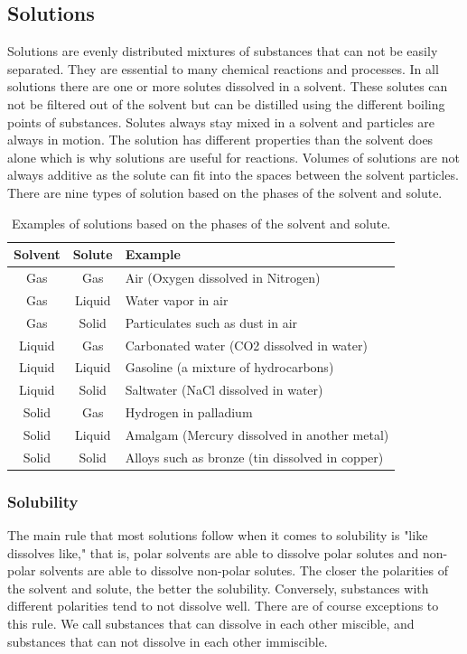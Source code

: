 \subsection{Solutions}
Solutions are evenly distributed mixtures of substances that can not be easily separated. They are essential to many chemical reactions and processes. In all solutions there are one or more solutes dissolved in a solvent. These solutes can not be filtered out of the solvent but can be distilled using the different boiling points of substances. Solutes always stay mixed in a solvent and particles are always in motion. The solution has different properties than the solvent does alone which is why solutions are useful for reactions. Volumes of solutions are not always additive as the solute can fit into the spaces between the solvent particles. There are nine types of solution based on the phases of the solvent and solute. 
\begin{table}[ht]
    \centering
    \begin{tabularx}{\columnwidth}{|c|c|X|}
        \hline
        \textbf{Solvent} & \textbf{Solute} & \textbf{Example} \\
        \hline
        Gas & Gas & Air (Oxygen dissolved in Nitrogen)\\
        Gas & Liquid & Water vapor in air\\
        Gas & Solid & Particulates such as dust in air\\
        Liquid & Gas & Carbonated water (CO2 dissolved in water)\\
        Liquid & Liquid & Gasoline (a mixture of hydrocarbons)\\
        Liquid & Solid & Saltwater (NaCl dissolved in water)\\
        Solid & Gas & Hydrogen in palladium\\
        Solid & Liquid & Amalgam (Mercury dissolved in another metal)\\
        Solid & Solid & Alloys such as bronze (tin dissolved in copper)\\
        \hline
    \end{tabularx}
    \caption{Examples of solutions based on the phases of the solvent and solute.}
    \label{tab:solution_types}
\end{table}
\subsubsection{Solubility}
The main rule that most solutions follow when it comes to solubility is "like dissolves like," that is, polar solvents are able to dissolve polar solutes and non-polar solvents are able to dissolve non-polar solutes. The closer the polarities of the solvent and solute, the better the solubility. Conversely, substances with different polarities tend to not dissolve well. There are of course exceptions to this rule. We call substances that can dissolve in each other miscible, and substances that can not dissolve in each other immiscible.

